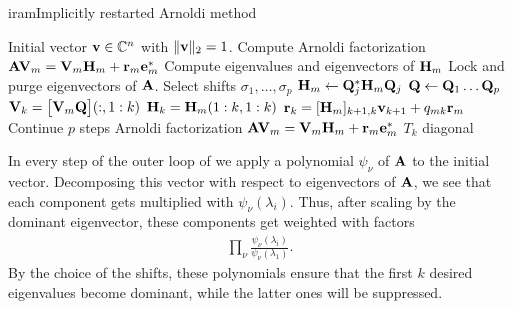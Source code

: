 \begin{Algorithm*}{iram}{Implicitly restarted Arnoldi method}
  \begin{algorithmic}[1]
    \Require Initial vector $\mathbf v\in\mathbb C^n$ with $\lVert\mathbf v\rVert_2=1$.
    \State Compute Arnoldi factorization
    $\mathbf A\mathbf V_m = \mathbf V_m\mathbf H_m + \mathbf r_m\mathbf e_m^*$
    \Repeat
    \State Compute eigenvalues and eigenvectors of $\mathbf H_m$
    \State Lock and purge eigenvectors of $\mathbf A$.
    \State Select shifts $\sigma_1,\dots,\sigma_p$
    \State $\mathbf H_m \gets \mathbf Q_j^*\mathbf H_m\mathbf Q_j$
    \EndFor
    \State $\mathbf Q \gets \mathbf Q_1\dots\mathbf Q_p$
    \State $\mathbf V_k = \bigl[\mathbf V_m\mathbf Q\bigr](:,1:k)$
    \State $\mathbf H_k = \mathbf H_m(1:k,1:k)$
    \State $\mathbf r_k= [\mathbf H_m]_{k+1,k}\mathbf v_{k+1} + q_{mk}\mathbf r_m$
    \State Continue $p$ steps Arnoldi factorization
    $\mathbf A\mathbf V_m = \mathbf V_m\mathbf H_m + \mathbf r_m\mathbf e_m^*$
    \Until $T_k$ diagonal
  \end{algorithmic}
\end{Algorithm*}

\begin{remark}
  In every step of the outer loop of  we
  apply a polynomial $\psi_\nu$ of $\mathbf A$ to the initial
  vector. Decomposing this vector with respect to eigenvectors of
  $\mathbf A$, we see that each component gets multiplied with
  $\psi_\nu(\lambda_i)$. Thus, after scaling by the dominant
  eigenvector, these components get weighted with factors
  \begin{gather}
    \prod_\nu\frac{\psi_\nu(\lambda_i)}{\psi_\nu(\lambda_1)}.
  \end{gather}
  By the choice of the shifts, these polynomials ensure that the first
  $k$ desired eigenvalues become dominant, while the latter ones will
  be suppressed.
\end{remark}

